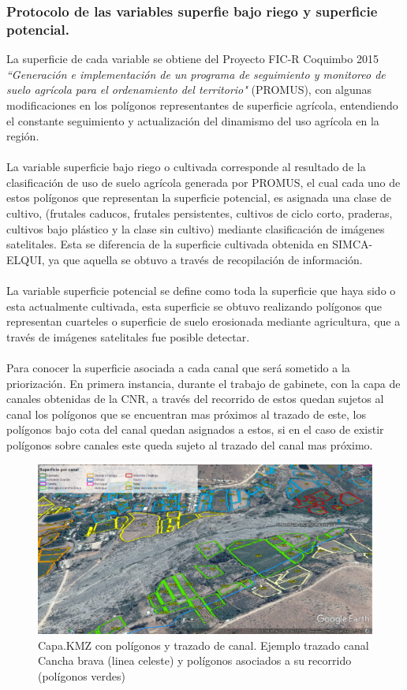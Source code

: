 \documentclass[]{article}
\begin{document}
\subsubsection{Protocolo de las variables superfie bajo riego y superficie potencial.}

La superficie de cada variable se obtiene del Proyecto FIC-R Coquimbo 2015 \textit{``Generación e implementación de un programa de seguimiento y monitoreo de suelo agrícola para el ordenamiento del territorio"} (PROMUS), con algunas modificaciones en los polígonos representantes de superficie agrícola, entendiendo el constante seguimiento y actualización del dinamismo del uso agrícola en la región.\\
\\
La variable superficie bajo riego o cultivada corresponde al resultado de la clasificación de uso de suelo agrícola generada por PROMUS, el cual cada uno de estos polígonos que representan la superficie potencial, es asignada una clase de cultivo, (frutales caducos, frutales persistentes, cultivos de ciclo corto, praderas, cultivos bajo plástico y la clase sin cultivo) mediante clasificación de imágenes satelitales. Esta se diferencia de la superficie cultivada obtenida en SIMCA-ELQUI, ya que aquella se obtuvo a través de recopilación de información.\\
\\
La variable superficie potencial se define como toda la superficie que haya sido o esta actualmente cultivada, esta superficie se obtuvo realizando polígonos que representan cuarteles o superficie de suelo erosionada mediante agricultura, que a través de imágenes satelitales fue posible detectar.\\
\\
Para conocer la superficie asociada a cada canal que será sometido a la priorización. En primera instancia, durante el trabajo de gabinete, con la capa de canales obtenidas de la CNR, a través del recorrido de estos quedan sujetos al canal los polígonos que se encuentran mas próximos al trazado de este, los polígonos bajo cota del canal quedan asignados a estos, si en el caso de existir polígonos sobre canales este queda sujeto al trazado del canal mas próximo.

\begin{figure}[h]
\centering
\includegraphics[width=\textwidth]{images/capa_kmz_area.eps}
\caption{Capa.KMZ con polígonos y trazado de canal. Ejemplo trazado canal Cancha brava (linea celeste) y polígonos asociados a su recorrido (polígonos verdes)}
\label{poligonos}
\end{figure}
\end{document}
